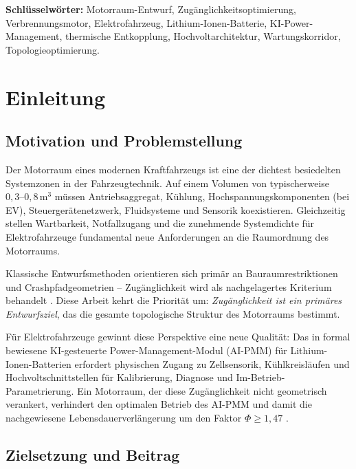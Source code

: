 ﻿\documentclass[12pt,a4paper]{article}
\begin{document}
\vspace{1cm}
\noindent\textbf{Schlüsselwörter:} Motorraum-Entwurf, Zugänglichkeitsoptimierung,
Verbrennungsmotor, Elektrofahrzeug, Lithium-Ionen-Batterie, KI-Power-Management,
thermische Entkopplung, Hochvoltarchitektur, Wartungskorridor, Topologieoptimierung.

\newpage
\tableofcontents
\newpage

\section{Einleitung}

\subsection{Motivation und Problemstellung}

Der Motorraum eines modernen Kraftfahrzeugs ist eine der dichtest besiedelten
Systemzonen in der Fahrzeugtechnik. Auf einem Volumen von typischerweise
$0{,}3\text{--}0{,}8\,\mathrm{m^3}$ müssen Antriebsaggregat, Kühlung,
Hochspannungskomponenten (bei EV), Steuergerätenetzwerk, Fluidsysteme und
Sensorik koexistieren. Gleichzeitig stellen Wartbarkeit, Notfallzugang und
die zunehmende Systemdichte für Elektrofahrzeuge fundamental neue Anforderungen
an die Raumordnung des Motorraums.

Klassische Entwurfsmethoden orientieren sich primär an Bauraumrestriktionen
und Crashpfadgeometrien -- Zugänglichkeit wird als nachgelagertes Kriterium
behandelt \cite{Heißing2013}. Diese Arbeit kehrt die Priorität um:
\textit{Zugänglichkeit ist ein primäres Entwurfsziel}, das die gesamte
topologische Struktur des Motorraums bestimmt.

Für Elektrofahrzeuge gewinnt diese Perspektive eine neue Qualität: Das in
\cite{Epp2026liion} formal bewiesene KI-gesteuerte Power-Management-Modul
(AI-PMM) für Lithium-Ionen-Batterien erfordert physischen Zugang zu Zellsensorik,
Kühlkreisläufen und Hochvoltschnittstellen für Kalibrierung, Diagnose und
Im-Betrieb-Parametrierung. Ein Motorraum, der diese Zugänglichkeit nicht
geometrisch verankert, verhindert den optimalen Betrieb des AI-PMM und
damit die nachgewiesene Lebensdauerverlängerung um den Faktor $\Phi \geq 1{,}47$
\cite{Epp2026liion}.

\subsection{Zielsetzung und Beitrag}
\end{document}

